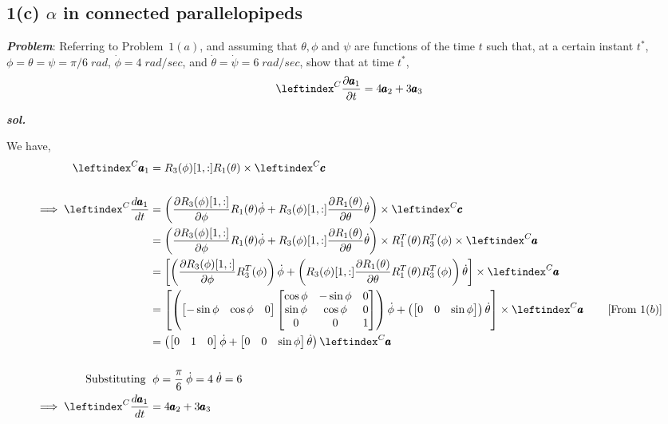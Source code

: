 \subsection{1(c) $\alpha$ in connected parallelopipeds}
\textbf{\textit{Problem}}: Referring to Problem~$1(a)$, and assuming that $\theta, \phi$ and $\psi$ are functions of the time $t$ such that, at a certain instant $t^*$, $\phi = \theta = \psi = \pi/6 \; rad$, $\dot \phi = 4 \; rad/sec$, and $\dot \theta = \dot \psi = 6 \; rad/sec$, show that at time $t^*$,
$$ \lx{^C}{\frac{\partial \pmb a_1}{\partial t}} = 4 \pmb a_2 + 3 \pmb a_3$$

\textbf{\textit{sol.}}

We have,
\begin{align*}
    \lx{^C}{{\pmb a_1}} &= R_3(\phi)[1, :] R_1(\theta) \times \lx{^C}{\pmb c}\\
    \\
    \implies \lx{^C}{\frac{d \pmb a_1}{dt}} &= \left( \frac{\partial R_3(\phi)[1, :]}{\partial \phi}   R_1(\theta) \dot \phi + R_3(\phi)[1, :] \frac{\partial R_1(\theta)}{\partial \theta } \dot \theta \right) \times \lx{^C}{\pmb c}\\
    &= \left( \frac{\partial R_3(\phi)[1, :]}{\partial \phi}   R_1(\theta) \dot \phi + R_3(\phi)[1, :] \frac{\partial R_1(\theta)}{\partial \theta } \dot \theta \right) \times R_1^T(\theta) R_3^T(\phi) \times \lx{^C}{\pmb a}\\
    &= \left[
    \left(\frac{\partial R_3(\phi)[1, :]}{\partial \phi}   R_3^T(\phi)
    \right)\dot \phi +
    \left(R_3(\phi)[1, :] \frac{\partial R_1(\theta)}{\partial \theta } R_1^T(\theta) R_3^T(\phi)
    \right) \dot \theta
    \right]\times \lx{^C}{\pmb a}\\
    &= \left[
    \left(\bm{-\sin \phi & \cos \phi & 0}\bm{
            \cos \phi & -\sin \phi  & 0\\
            \sin \phi & \cos \phi & 0\\
            0          & 0         & 1
        }
    \right)\dot \phi +
    \left(\bm{0 & 0 & \sin \phi}
    \right) \dot \theta
    \right]\times \lx{^C}{\pmb a}
    \qquad \left[\text{From } 1(b) \right]\\
    &= \left( \bm{0&1&0} \dot \phi + \bm{0 & 0 & \sin \phi} \dot \theta \right) \lx{^C}{{\pmb a}}\\
    \\
    \text{Substituting }&\; \phi = \frac{\pi}{6} \: \dot \phi =4 \; \dot \theta = 6\\
    \implies \lx{^C}{\frac{d \pmb a_1}{dt}} &= 4 \pmb a_2 + 3 \pmb a_3
\end{align*}
